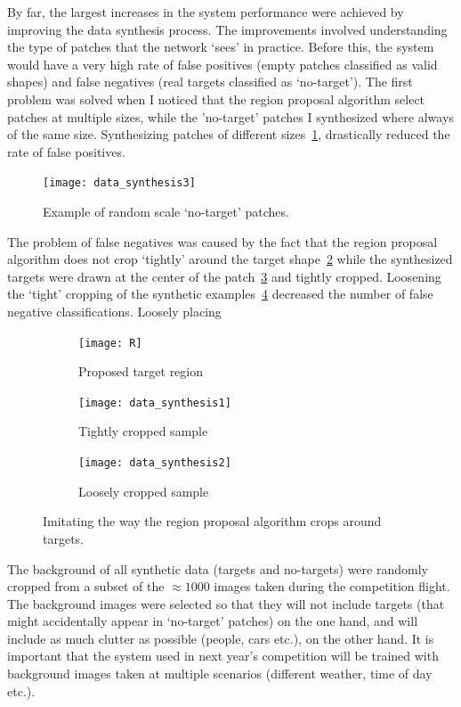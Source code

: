 \documentclass{article} %
\begin{document}
By far, the largest increases in the system performance were achieved by improving
the data synthesis process. The improvements involved understanding the type of
patches that the network `sees' in practice. Before this, the system would have
a very high rate of false positives (empty patches classified as valid shapes) and
false negatives (real targets classified as `no-target'). The first problem was
solved when I noticed that the region proposal algorithm select patches at 
multiple sizes, while the 'no-target' patches I synthesized where always of the
same size. Synthesizing patches of different sizes~\cref{fig:random_no_target}, drastically
reduced the rate of false positives.
\begin{figure}[h]
	\centering
	\texttt{[image: data\_synthesis3]}
	\caption{Example of random scale `no-target' patches.}
	\label{fig:random_no_target}
\end{figure}

The problem of false negatives was caused by the fact that the region proposal
algorithm does not crop `tightly' around the target shape~\cref{fig:sub1} while
the synthesized targets were drawn at the center of the patch~\cref{fig:sub2}
and tightly cropped. Loosening the `tight' cropping of the synthetic examples~\cref{fig:sub3}
decreased the number of false negative classifications.
Loosely placing 
\begin{figure}[h]
	\centering
	\begin{subfigure}{.3\textwidth}
		\centering
		\texttt{[image: R]}
		\caption{Proposed target region}
		\label{fig:sub1}
	\end{subfigure}%
	\begin{subfigure}{.3\textwidth}
		\centering
		\texttt{[image: data\_synthesis1]}
		\caption{Tightly cropped sample}
		\label{fig:sub2}
	\end{subfigure}
	\begin{subfigure}{.3\textwidth}
		\centering
		\texttt{[image: data\_synthesis2]}
		\caption{Loosely cropped sample}
		\label{fig:sub3}
	\end{subfigure}
	\caption{Imitating the way the region proposal algorithm crops around targets.}
	\label{fig:data_synthesis}
\end{figure}

The background of all synthetic data (targets and no-targets) were randomly cropped
from a subset of the $\approx1000$ images taken during the competition flight.
The background images were selected so that they will not include targets (that
might accidentally appear in `no-target' patches) on the one hand, and will include
as much clutter as possible (people, cars etc.), on the other hand.
It is important that the system used in next year's competition will be trained with
background images taken at multiple scenarios (different weather, time of day etc.). 
\end{document}
